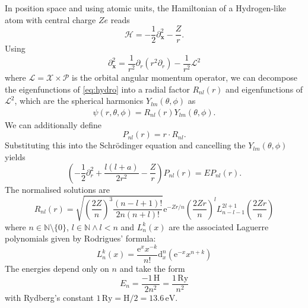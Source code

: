 \documentclass[a4paper,DIV=12,english]{scrartcl}
\begin{document}
In position space and using atomic units, the Hamiltonian of a Hydrogen-like atom with central charge $Ze$ reads 
\begin{equation}\label{eq:hydro}
    \mathcal{H} = -\frac{1}{2}\partial_\textbf{x}^2 - \frac{Z}{r}.
\end{equation}
Using 
\begin{equation}
    \partial_\textbf{x}^2 = \frac{1}{r^2}\partial_r\left( r^2\partial_r \right) - \frac{1}{r^2}\mathcal{L}^2
\end{equation}
where $\mathcal{L} = \mathcal{X}\times\mathcal{P}$ is the orbital angular momentum operator, we can decompose the eigenfunctions of \eqref{eq:hydro} into a radial factor $R_{nl}(r)$ and eigenfunctions of $\mathcal{L}^2$, which are the spherical harmonics $Y_{lm}(\theta,\phi)$ as 
\begin{eqnarray}
    \psi(r,\theta,\phi) = R_{nl}(r)Y_{lm}(\theta,\phi).
\end{eqnarray}
We can additionally define
\begin{equation}
    P_{nl}(r) = r\cdot R_{nl}.
\end{equation}
Substituting this into the Schrödinger equation and cancelling the $Y_{lm}(\theta,\phi)$ yields
\begin{equation}
    \left(-\frac{1}{2}\partial_r^2 + \frac{l(l+a)}{2r^2} - \frac{Z}{r}\right)P_{nl}(r) = EP_{nl}(r).
\end{equation}
The normalised solutions are
\begin{equation}
    R_{nl}(r) = \sqrt{\left(\frac{2Z}{n}\right)^3\frac{(n-l+1)!}{2n(n+l)!}} \text{e}^{-Zr/n} \left(\frac{2Zr}{n}\right)^l L_{n-l-1}^{2l+1}\left(\frac{2Zr}{n}\right)
\end{equation}
where $n\in\mathbb{N}\setminus \{0\}$, $l\in\mathbb{N} \land l < n$ and $L_n^k(x)$ are the associated Laguerre polynomials given by Rodrigues' formula:
\begin{equation}
    L_n^k(x) = \frac{\text{e}^x x^{-k}}{n!}\text{d}_x^n\left( \text{e}^{-x} x^{n+k} \right)
\end{equation}
The energies depend only on $n$ and take the form 
\begin{equation}
    E_n = \frac{-1\,\text{H}}{2n^2} = \frac{1\,\text{Ry}}{n^2}
\end{equation}
with Rydberg's constant $1\,\text{Ry}=\text{H}/2=13.6\,\text{eV}$.
\end{document}
